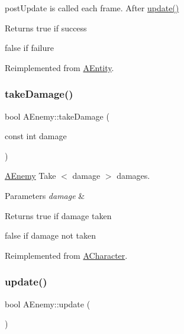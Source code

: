 post\+Update is called each frame. After \hyperlink{class_a_enemy_a01e3b0313d6f29bf2cafe20f711c0550}{update()} 

\begin{DoxyReturn}{Returns}
true if success 

false if failure 
\end{DoxyReturn}


Reimplemented from \hyperlink{class_a_entity_ae2faa1d11e21033a223fef2bc03b9338}{A\+Entity}.

\mbox{\label{class_a_enemy_a17bcf116c42c3d780e243127adf1a947}} 
\subsubsection{\texorpdfstring{take\+Damage()}{takeDamage()}}
{\footnotesize\ttfamily bool A\+Enemy\+::take\+Damage (\begin{DoxyParamCaption}\item[{const int}]{damage }\end{DoxyParamCaption})\hspace{0.3cm}{\ttfamily [virtual]}}



\hyperlink{class_a_enemy}{A\+Enemy} Take $<$ damage $>$ damages. 


\begin{DoxyParams}{Parameters}
{\em damage} & \\
\hline
\end{DoxyParams}
\begin{DoxyReturn}{Returns}
true if damage taken 

false if damage not taken 
\end{DoxyReturn}


Reimplemented from \hyperlink{class_a_character_a1ab94580e4db621f79f0bf1d6bcdb600}{A\+Character}.

\mbox{\label{class_a_enemy_a01e3b0313d6f29bf2cafe20f711c0550}} 
\subsubsection{\texorpdfstring{update()}{update()}}
{\footnotesize\ttfamily bool A\+Enemy\+::update (\begin{DoxyParamCaption}{ }\end{DoxyParamCaption})\hspace{0.3cm}{\ttfamily [virtual]}}



